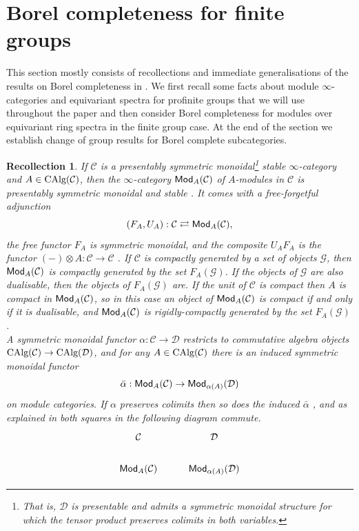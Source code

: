 \documentclass[reqno]{amsart}
\numberwithin{equation}{section}\theoremstyle{thms}
\theoremstyle{defn}
\newtheorem{rec}[equation]{Recollection}
\newcommand{\cC}{\mathcal{C}}
\newcommand{\cD}{\mathcal{D}}
\newcommand{\cG}{\mathcal{G}}
\newcommand{\tn}[1]{\textnormal{#1}}
\newcommand{\tsf}[1]{\textsf{\textup{#1}}}
\newcommand{\calg}{\tn{CAlg}}
\newcommand{\Mod}{\tsf{Mod}}
\begin{document}
\section{Borel completeness for finite groups}\label{sec:borelfinite}

This section mostly consists of recollections and immediate generalisations of the results on Borel completeness in \cite{mnn17}. We first recall some facts about module $\infty$-categories and equivariant spectra for profinite groups that we will use throughout the paper and then consider Borel completeness for modules over equivariant ring spectra in the finite group case. At the end of the section we establish change of group results for Borel complete subcategories.

\begin{rec}\label{rec:modules}
If $\cC$ is a presentably symmetric monoidal\footnote{That is, $\cD$ is presentable and admits a symmetric monoidal structure for which the tensor product preserves colimits in both variables.} stable $\infty$-category and $A \in \calg(\cC)$, then the $\infty$-category $\Mod_A(\cC)$ of $A$-modules in $\cC$ is presentably symmetric monoidal and stable \cite[Theorem 3.4.4.2]{lur17}. It comes with a free-forgetful adjunction
$$(F_A,U_A): \cC \rightleftarrows \Mod_A(\cC),$$
the free functor $F_A$ is symmetric monoidal, and the composite $U_AF_A$ is the functor $(-) \otimes A: \cC \to \cC$ \cite[Corollary 4.2.3.7, 4.2.4.8, Theorem 4.5.2.1, §4.5.3]{lur17}. If $\cC$ is compactly generated by a set of objects $\cG$, then $\Mod_A(\cC)$ is compactly generated by the set $F_A(\cG)$. If the objects of $\cG$ are also dualisable, then the objects of $F_A(\cG)$ are. If the unit of $\cC$ is compact then $A$ is compact in $\Mod_A(\cC)$, so in this case an object of $\Mod_A(\cC)$ is compact if and only if it is dualisable, and $\Mod_A(\cC)$ is rigidly-compactly generated by the set $F_A(\cG)$. \\
A symmetric monoidal functor $\alpha: \cC \to \cD$ restricts to commutative algebra objects $\calg(\cC) \to \calg(\cD)$, and for any $A \in \calg(\cC)$ there is an induced symmetric monoidal functor
$$\bar{\alpha}: \Mod_A(\cC) \to \Mod_{\alpha(A)}(\cD)$$
on module categories. If $\alpha$ preserves colimits then so does the induced $\bar{\alpha}$ \cite[Corollary 4.2.3.5]{lur17}, and as explained in \cite[Remark 1.1.11]{erg22} both squares in the following diagram commute.
\[\begin{tikzcd}
	\cC & \cD \\
	{\Mod_A(\cC)} & {\Mod_{\alpha(A)}(\cD)}

\end{tikzcd}\]
\end{rec}
\end{document}
